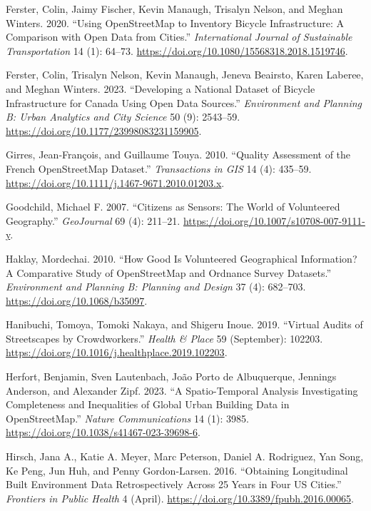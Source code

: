 \documentclass[
]{article}
\newlength{\cslhangindent}
\newenvironment{CSLReferences}[2] %
 {\begin{list}{}{%
  \setlength{\itemindent}{0pt}
  \setlength{\leftmargin}{0pt}
  \setlength{\parsep}{0pt}
  \ifodd #1
   \setlength{\leftmargin}{\cslhangindent}
   \setlength{\itemindent}{-1\cslhangindent}
  \fi
  \setlength{\itemsep}{#2\baselineskip}}}
 {\end{list}}
\begin{document}
\begin{CSLReferences}{1}{0}
Ferster, Colin, Jaimy Fischer, Kevin Manaugh, Trisalyn Nelson, and
Meghan Winters. 2020. {``Using {OpenStreetMap} to Inventory Bicycle
Infrastructure: {A} Comparison with Open Data from Cities.''}
\emph{International Journal of Sustainable Transportation} 14 (1):
64--73. \url{https://doi.org/10.1080/15568318.2018.1519746}.

Ferster, Colin, Trisalyn Nelson, Kevin Manaugh, Jeneva Beairsto, Karen
Laberee, and Meghan Winters. 2023. {``Developing a National Dataset of
Bicycle Infrastructure for {Canada} Using Open Data Sources.''}
\emph{Environment and Planning B: Urban Analytics and City Science} 50
(9): 2543--59. \url{https://doi.org/10.1177/23998083231159905}.

Girres, Jean‐François, and Guillaume Touya. 2010. {``Quality
{Assessment} of the {French} {OpenStreetMap} {Dataset}.''}
\emph{Transactions in GIS} 14 (4): 435--59.
\url{https://doi.org/10.1111/j.1467-9671.2010.01203.x}.

Goodchild, Michael F. 2007. {``Citizens as Sensors: The World of
Volunteered Geography.''} \emph{GeoJournal} 69 (4): 211--21.
\url{https://doi.org/10.1007/s10708-007-9111-y}.

Haklay, Mordechai. 2010. {``How {Good} Is {Volunteered} {Geographical}
{Information}? {A} {Comparative} {Study} of {OpenStreetMap} and
{Ordnance} {Survey} {Datasets}.''} \emph{Environment and Planning B:
Planning and Design} 37 (4): 682--703.
\url{https://doi.org/10.1068/b35097}.

Hanibuchi, Tomoya, Tomoki Nakaya, and Shigeru Inoue. 2019. {``Virtual
Audits of Streetscapes by Crowdworkers.''} \emph{Health \& Place} 59
(September): 102203.
\url{https://doi.org/10.1016/j.healthplace.2019.102203}.

Herfort, Benjamin, Sven Lautenbach, João Porto de Albuquerque, Jennings
Anderson, and Alexander Zipf. 2023. {``A Spatio-Temporal Analysis
Investigating Completeness and Inequalities of Global Urban Building
Data in {OpenStreetMap}.''} \emph{Nature Communications} 14 (1): 3985.
\url{https://doi.org/10.1038/s41467-023-39698-6}.

Hirsch, Jana A., Katie A. Meyer, Marc Peterson, Daniel A. Rodriguez, Yan
Song, Ke Peng, Jun Huh, and Penny Gordon-Larsen. 2016. {``Obtaining
{Longitudinal} {Built} {Environment} {Data} {Retrospectively} Across 25
Years in {Four} {US} {Cities}.''} \emph{Frontiers in Public Health} 4
(April). \url{https://doi.org/10.3389/fpubh.2016.00065}.


\end{CSLReferences}
\end{document}
